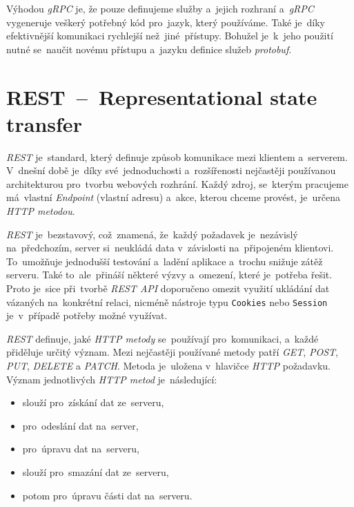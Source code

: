\documentclass[11pt,a4paper]{report}
\newcommand{\harddata}[1]{\boxed{\texttt{#1}}}
\begin{document}
            Výhodou \emph{gRPC} je, že pouze definujeme služby a~jejich rozhraní a~\emph{gRPC} vygeneruje veškerý potřebný kód pro~jazyk, který používáme. Také je~díky efektivnější komunikaci rychlejší než~jiné~přístupy. Bohužel je~k~jeho použití nutné se~naučit novému přístupu a~jazyku definice služeb \emph{protobuf}. \cite{thenewstackBuildRealWorld}

        \section{REST~--~Representational state transfer}
            \emph{REST} je~standard, který definuje způsob komunikace mezi klientem a~serverem. V~dnešní době je~díky své~jednoduchosti a~rozšířenosti nejčastěji používanou architekturou pro~tvorbu webových rozhrání. Každý zdroj, se~kterým pracujeme má~vlastní \emph{Endpoint} (vlastní adresu) a~akce, kterou chceme provést, je~určena \emph{HTTP metodou}.
            
            \emph{REST} je~bezstavový, což~znamená, že~každý požadavek je~nezávislý na~předchozím, server si~neukládá data v~závislosti na~připojeném klientovi. To~umožňuje jednodušší testování a~ladění aplikace a~trochu snižuje zátěž serveru. Také to~ale~přináší některé výzvy a~omezení, které je~potřeba řešit. Proto je~sice při~tvorbě \emph{REST API} doporučeno omezit využití ukládání dat vázaných na~konkrétní relaci, nicméně nástroje typu \texttt{Cookies} nebo \texttt{Session} je~v~případě potřeby možné využívat.
            
            \emph{REST} definuje, jaké \emph{HTTP metody} se~používají pro~komunikaci, a~každé přiděluje určitý význam. Mezi nejčastěji používané metody patří \emph{GET}, \emph{POST}, \emph{PUT}, \emph{DELETE} a \emph{PATCH}. Metoda je~uložena v~hlavičce \emph{HTTP} požadavku. Význam jednotlivých \emph{HTTP metod} je~následující:
            
            \begin{itemize}
                \item \harddata{GET} slouží pro~získání dat ze~serveru,
                \item \harddata{POST} pro~odeslání dat na~server,
                \item \harddata{PUT} pro~úpravu dat na~serveru,
                \item \harddata{DELETE} slouží pro~smazání dat ze~serveru,
                \item \harddata{PATCH} potom pro~úpravu části dat na~serveru.
            \end{itemize}
\end{document}
